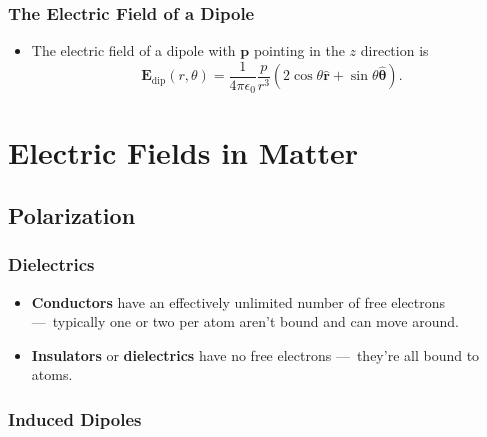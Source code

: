 \documentclass{article}
\renewcommand{\vec}[1]{\boldsymbol{\mathbf{#1}}}
\newcommand{\uvec}[1]{\hat{\vec{#1}}}
\newcommand{\ke}{\frac{1}{4 \pi \epsilon_0}}
\begin{document}
\subsubsection{The Electric Field of a Dipole}

\begin{itemize}
  \item The electric field of a dipole with $\vec{p}$ pointing in the $z$ direction is \[\vec{E}_\text{dip}(r, \theta) = \ke \frac{p}{r^3} (2 \cos \theta \uvec{r} + \sin \theta \uvec{\theta}).\]
\end{itemize}

\section{Electric Fields in Matter}

\subsection{Polarization}

\subsubsection{Dielectrics}

\begin{itemize}
  \item \textbf{Conductors} have an effectively unlimited number of free electrons — typically one or two per atom aren't bound and can move around.

  \item \textbf{Insulators} or \textbf{dielectrics} have no free electrons — they're all bound to atoms.
\end{itemize}

\subsubsection{Induced Dipoles}
\end{document}
